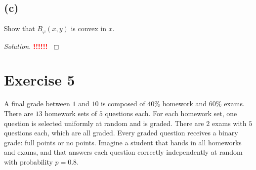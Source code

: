 \documentclass[10pt, a4paper, twoside]{amsart}
\newenvironment{solution}
               {\let\oldqedsymbol=\qedsymbol
                \renewcommand{\qedsymbol}{$\blacktriangleleft$}
                \begin{proof}[Solution]}
               {\end{proof}
                \renewcommand{\qedsymbol}{\oldqedsymbol}}
\newcommand{\TODO}{\textcolor{red}{\textbf{!!!!!! }}}
\begin{document}
\subsection*{(c)}
Show that $B_{\varphi}(x,y)$ is convex in $x$.
\begin{solution}
\TODO 
\end{solution}


\section*{Exercise 5}
A final grade between $1$ and $10$ is composed of $40\%$ homework
and $60\%$ exams. There are $13$ homework sets of $5$ questions each. For
each homework set, one question is selected uniformly at random and is
graded. There are $2$ exams with $5$ questions each, which are all graded.
Every graded question receives a binary grade: full points or no points.
Imagine a student that hands in all homeworks and exams, and that answers 
each question correctly independently at random with probability $p = 0.8$.
\end{document}
